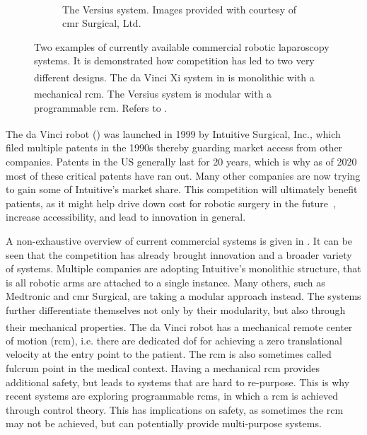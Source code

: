 \begin{figure}[h    tb]
\begin{subfigure}[b]{0.49\textwidth}
        \caption{The Versius\textsuperscript{\textregistered} system. Images provided with courtesy of  \gls{cmr} Surgical, Ltd.}
        \label{in:fig:versius}
    \end{subfigure}
    \caption{Two examples of currently available commercial robotic laparoscopy systems. It is demonstrated how competition has led to two very different designs. The da Vinci\textsuperscript{\textregistered} Xi system in  is monolithic with a mechanical \gls{rcm}. The Versius\textsuperscript{\textregistered} system is modular with a programmable \gls{rcm}. Refers to .}
    \label{in:fig:surgical_systems}
\end{figure}

The da Vinci\textsuperscript{\textregistered} robot () was launched in 1999 by Intuitive Surgical, Inc., which filed multiple patents in the 1990s thereby guarding market access from other companies. Patents in the US generally last for 20 years, which is why as of 2020 most of these critical patents have ran out. Many other companies are now trying to gain some of Intuitive's market share. This competition will ultimately benefit patients, as it might help drive down cost for robotic surgery in the future~\cite{patel2021can}, increase accessibility, and lead to innovation in general. 

A non-exhaustive overview of current commercial systems is given in . It can be seen that the competition has already brought innovation and a broader variety of systems. Multiple companies are adopting Intuitive's monolithic structure, that is all robotic arms are attached to a single instance. Many others, such as Medtronic and \gls{cmr} Surgical, are taking a modular approach instead. The systems further differentiate themselves not only by their modularity, but also through their mechanical properties. The da Vinci\textsuperscript{\textregistered} robot has a mechanical remote center of motion (\gls{rcm}), i.e. there are dedicated \gls{dof} for achieving a zero translational velocity at the entry point to the patient. The \gls{rcm} is also sometimes called fulcrum point in the medical context. Having a mechanical \gls{rcm} provides additional safety, but leads to systems that are hard to re-purpose. This is why recent systems are exploring programmable \gls{rcm}s, in which a \gls{rcm} is achieved through control theory. This has implications on safety, as sometimes the \gls{rcm} may not be achieved, but can potentially provide multi-purpose systems. 

